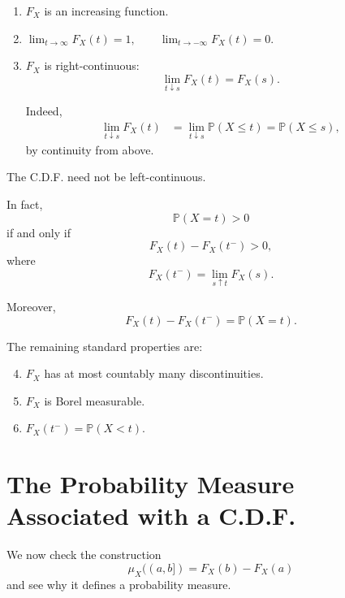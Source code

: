 \begin{enumerate}

    \item $F_X$ is an increasing function.

    \item
    \(
    \lim_{t\to\infty}F_X(t)=1,
    \qquad
    \lim_{t\to-\infty}F_X(t)=0.
    \)

    \item $F_X$ is right-continuous:
    \[
    \lim_{t\downarrow s}F_X(t)=F_X(s).
    \]

    Indeed,
    \[
    \begin{aligned}
    \lim_{t\downarrow s}F_X(t)
    &=
    \lim_{t\downarrow s}
    \mathbb{P}(X\leq t)=
    \mathbb{P}(X\leq s),
    \end{aligned}
    \]
    by continuity from above.

\end{enumerate}

\begin{remark}

The C.D.F. need not be left-continuous.

In fact,
\[
\mathbb{P}(X=t)>0
\]
if and only if
\[
F_X(t)-F_X(t^-)>0,
\]
where
\[
F_X(t^-)
=
\lim_{s\uparrow t}F_X(s).
\]

Moreover,
\[
F_X(t)-F_X(t^-)
=
\mathbb{P}(X=t).
\]
\end{remark}

The remaining standard properties are:

\begin{enumerate}
    \setcounter{enumi}{3}

    \item $F_X$ has at most countably many discontinuities.

    \item $F_X$ is Borel measurable.

    \item
    \(
    F_X(t^-)
    =
    \mathbb{P}(X<t).
    \)
\end{enumerate}

\section{The Probability Measure Associated with a C.D.F.}

We now check the construction
\[
\mu_X((a,b])
=
F_X(b)-F_X(a)
\]
and see why it defines a probability measure.

